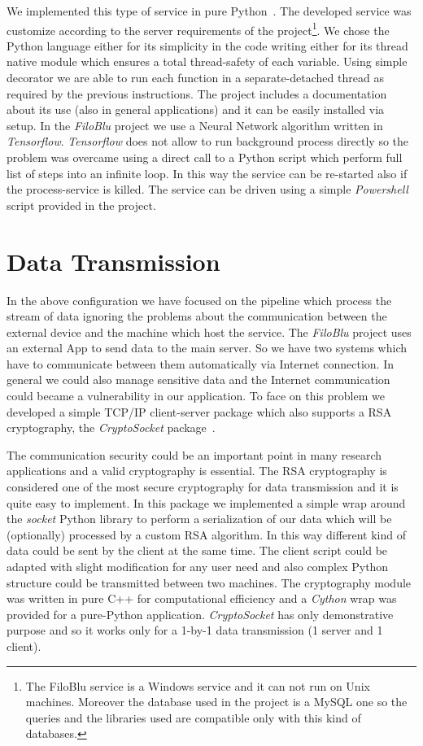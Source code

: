 \documentclass{standalone}
\begin{document}
We implemented this type of service in pure Python~\cite{FiloBlu}.
The developed service was customize according to the server requirements of the project\footnote{
  The FiloBlu service is a Windows service and it can not run on Unix machines.
  Moreover the database used in the project is a MySQL one so the queries and the libraries used are compatible only with this kind of databases.
}.
We chose the Python language either for its simplicity in the code writing either for its thread native module which ensures a total thread-safety of each variable.
Using simple decorator we are able to run each function in a separate-detached thread as required by the previous instructions.
The project includes a documentation about its use (also in general applications) and it can be easily installed via \textsf{setup}.
In the \emph{FiloBlu} project we use a Neural Network algorithm written in \emph{Tensorflow}.
\emph{Tensorflow} does not allow to run background process directly so the problem was overcame using a direct call to a Python script which perform full list of steps into an infinite loop.
In this way the service can be re-started also if the process-service is killed.
The service can be driven using a simple \emph{Powershell} script provided in the project.



\section*{Data Transmission}

In the above configuration we have focused on the pipeline which process the stream of data ignoring the problems about the communication between the external device and the machine which host the service.
The \emph{FiloBlu} project uses an external App to send data to the main server.
So we have two systems which have to communicate between them automatically via Internet connection.
In general we could also manage sensitive data and the Internet communication could became a vulnerability in our application.
To face on this problem we developed a simple TCP/IP client-server package which also supports a RSA cryptography, the \emph{CryptoSocket} package~\cite{CryptoSocket}.

The communication security could be an important point in many research applications and a valid cryptography is essential.
The RSA cryptography is considered one of the most secure cryptography for data transmission and it is quite easy to implement.
In this package we implemented a simple wrap around the \emph{socket} Python library to perform a serialization of our data which will be (optionally) processed by a custom RSA algorithm.
In this way different kind of data could be sent by the client at the same time.
The client script could be adapted with slight modification for any user need and also complex Python structure could be transmitted between two machines.
The cryptography module was written in pure C++ for computational efficiency and a \emph{Cython} wrap was provided for a pure-Python application.
\emph{CryptoSocket} has only demonstrative purpose and so it works only for a 1-by-1 data transmission (1 server and 1 client).
\end{document}
